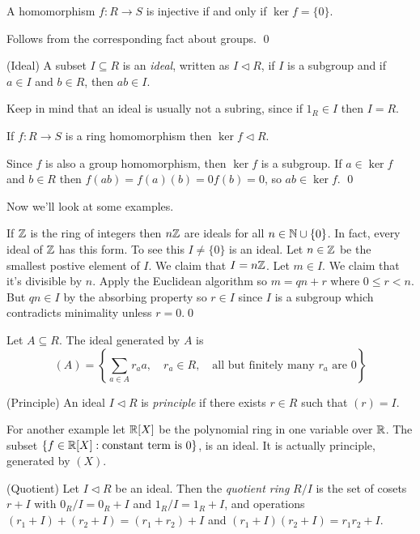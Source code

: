 \documentclass{article}
\newcommand{\nrm}{\triangleleft}
\begin{document}
\begin{lemma}
	A homomorphism $ f:R\to S $ is injective if and only if $ \ker f = \{0\} $.
\end{lemma}
\pf Follows from the corresponding fact about groups. \qed
\begin{definition}
	(Ideal) A subset $ I\subseteq R $ is an \textit{ideal}, written as $ I\nrm R $, if $ I $ is a subgroup and if $ a\in I $ and $ b\in R $, then $ ab\in I $.
\end{definition}
Keep in mind that an ideal is usually not a subring, since if $ 1_R\in I $ then $ I=R $.
\begin{lemma}
  If $ f:R\to S $ is a ring homomorphism then $ \ker f \nrm R$.
\end{lemma} 
\pf Since $ f $ is also a group homomorphism, then $ \ker f $ is a subgroup. If $ a\in \ker f $ and $ b\in R $ then $ f(ab)=f(a)(b)=0f(b)=0 $, so $ ab\in \ker f $. \qed\par
Now we'll look at some examples.\par
If $ \mathbb{Z} $ is the ring of integers then $ n\mathbb{Z} $ are ideals for all $ n\in\mathbb{N} \cup \{0\} $. In fact, every ideal of $ \mathbb{Z} $ has this form. To see this $ I\ne \{0\} $ is an ideal. Let $ n\in \mathbb{Z} $ be the smallest postive element of $ I $. We claim that $ I=n\mathbb{Z} $. Let $ m\in I $. We claim that it's divisible by $ n $. Apply the Euclidean algorithm so $ m=qn+r $ where $ 0\le r<n $. But $ qn\in I $ by the absorbing property so $ r\in I $ since $ I $ is a subgroup which contradicts minimality unless $ r=0 $.\qed
\begin{definition}
  Let $ A\subseteq R $. The ideal generated by $ A $ is
  \[
	  (A)=\left\{\sum_{a\in A}r_aa,\quad r_a \in R, \quad \text{all but finitely many } r_a \text{ are } 0\right\}
  \]
\end{definition}
\begin{definition}
	(Principle) An ideal $ I\nrm R $ is \textit{principle} if there exists $ r\in R $ such that $ (r)=I $.
\end{definition}
For another example let $ \mathbb{R}[X] $ be the polynomial ring in one variable over $ \mathbb{R} $. The subset $ \{f\in \mathbb{R}[X]: \text{constant term is } 0\} $, is an ideal. It is actually principle, generated by $ (X) $.

\begin{definition}
	(Quotient) Let $ I\nrm R $ be an ideal. Then the \textit{quotient ring} $ R/I $ is the set of cosets $ r+I $ with $ 0_R/I=0_R+I $ and $ 1_R/I=1_R+I $, and operations $ (r_1+I)+(r_2+I)=(r_1+r_2)+I $ and $ (r_1+I)(r_2+I)=r_1r_2+I $.
\end{definition}
\end{document}
